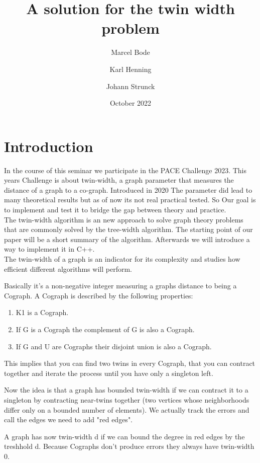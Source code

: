 \documentclass[acmsmall,review]{acmart}
\date{October 2022}
\title{A solution for the twin width problem}
\author{Marcel Bode}
\author{Karl Henning}
\author{Johann Strunck}
\begin{document}
\maketitle

\section{Introduction}

In the course of this seminar we participate in the PACE Challenge 2023. This years Challenge is about twin-width, a graph parameter that measures the distance of a graph to a co-graph. Introduced in 2020 The parameter did lead to many theoretical results but as of now its not real practical tested. So Our goal is to implement and test it to bridge the gap between theory and practice. %
\\
The twin-width algorithm is an new approach to solve graph theory problems that are commonly solved by the tree-width algorithm. The starting point of our paper will be a short summary of the algorithm. Afterwards we will introduce a way to implement it in C++.
\\
The twin-width of a graph is an indicator for its complexity and studies how efficient different algorithms will perform.

Basically it's a non-negative integer measuring a graphs distance to being a Cograph.
A Cograph is described by the following properties:
\begin{enumerate}
    \item K1 is a Cograph.
    \item If G is a Cograph the complement of G is also a Cograph.
    \item If G and U are Cographs their disjoint union is also a Cograph.
\end{enumerate}
This implies that you can find two twins in every Cograph, that you can contract together and iterate the process until you have only a singleton left.

Now the idea is that a graph has bounded twin-width if we can contract it to a singleton by contracting near-twins together
(two vertices whose neighborhoods differ only on a bounded number of elements). We actually track the errors and call the edges we need to add "red edges".

A graph has now twin-width d if we can bound the degree in red edges by the treshhold d. Because Cographs don't produce errors they always have twin-width 0. \\
\end{document}
